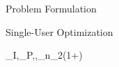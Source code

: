 \documentclass{IEEEtran}
\begin{document}
\begin{section}{Problem Formulation}
\begin{subsection}{Single-User Optimization}
		\begin{maxi}
			{\boldsymbol{w}_I,_P,,\rho}{\sum_{n}{\log_2\left(1+\right)}}{\label{op:temp3}}{}
		\end{maxi}

\end{subsection}
\end{section}
\end{document}
